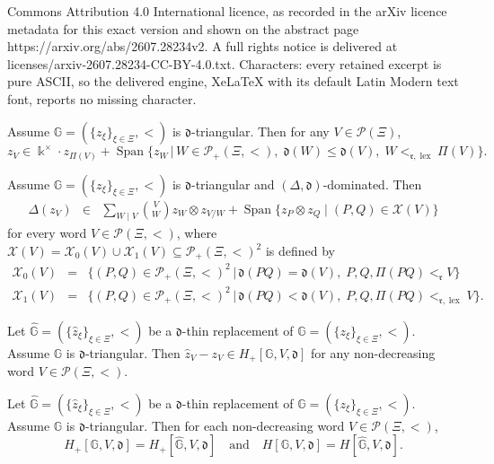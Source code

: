 \documentclass[10pt,a4paper]{amsart}
\newcommand{\GG}{\mathbb{G}}
\newcommand{\PP}{\mathcal{P}}
\DeclareMathOperator{\Span}{Span}
\newcommand{\dd}{\mathfrak{d}}
\DeclareMathOperator{\lex}{lex}
\newcommand{\rr}{\mathfrak{r}}
\begin{document}
Commons Attribution 4.0 International licence, as recorded in the arXiv licence metadata for this exact version and shown on the abstract page https://arxiv.org/abs/2607.28234v2. A full rights notice is delivered at licenses/arxiv-2607.28234-CC-BY-4.0.txt. Characters: every retained excerpt is pure ASCII, so the delivered engine, XeLaTeX with its default Latin Modern text font, reports no missing character.
	\begin{lemma}\label{rearrangement}
		Assume $\GG=(\{z_{\xi}\}_{\xi\in \Xi}, <)$ is $\dd$-triangular. Then for any $V\in \PP(\Xi)$,
		\[
		z_V \in \Bbbk^{\times} \cdot z_{\Pi(V)} +  \Span\big\{z_{W} \,\big|\, W \in \PP_{+}(\Xi, <),\; \dd(W) \leq \dd(V),\; W<_{\rr,\lex} \Pi(V) \big\}.
		\]
	\end{lemma}

	\begin{prop}\label{comultiplication}
		Assume $\GG=(\{z_\xi\}_{\xi \in\Xi},<)$ is $\dd$-triangular and $(\Delta,\dd)$-dominated. Then
		\begin{eqnarray*}
			\Delta(z_{V}) & \in &  \sum_{W\mid V}\binom{V}{W}z_{W} \otimes z_{V/W} + \Span\{z_{P}\otimes z_{Q} \mid (P,Q) \in \mathcal{X}(V)\}
		\end{eqnarray*}
		for every word $V\in \PP(\Xi, <)$, where $\mathcal{X}(V) = \mathcal{X}_{0}(V)\cup \mathcal{X}_{1}(V) \subseteq  \PP_{+}(\Xi,<)^{2}$ is defined by
		\begin{eqnarray*}
			\mathcal{X}_{0}(V) &=& \big\{ (P,Q) \in \PP_{+}(\Xi,<)^{2} \,\big|\,  \dd(PQ) = \dd(V),\; P, Q, \Pi(PQ)<_{\rr} V \big\}\\
			\mathcal{X}_{1}(V) &=& \big\{ (P,Q) \in \PP_{+}(\Xi,<)^{2} \,\big|\, \dd(PQ) < \dd(V),\; P, Q, \Pi(PQ) <_{\rr,\lex}V \big\}.
		\end{eqnarray*}
	\end{prop}

	\begin{lemma}\label{replacement-control}
		Let $\hat{\GG}=(\{\hat{z}_{\xi}\}_{\xi\in \Xi}, <)$ be a $\dd$-thin replacement of $\GG=(\{z_{\xi}\}_{\xi\in \Xi}, <)$. Assume $\GG$ is $\dd$-triangular. Then $\hat{z}_V -z_{V} \in H_{+}[\GG,V,\dd]$ for any non-decreasing word $V\in \mathcal{P}(\Xi,<)$.
	\end{lemma}

	\begin{lemma}\label{equality of H}
		Let $\hat{\GG}=(\{\hat{z}_{\xi}\}_{\xi\in \Xi}, <)$ be a $\dd$-thin replacement of $\GG=(\{z_{\xi}\}_{\xi\in \Xi}, <)$. Assume $\GG$ is $\dd$-triangular. Then for each non-decreasing word $V\in \mathcal{P}(\Xi, <)$,
		\[
		H_{+}[\GG,V,\dd]=H_{+}[\hat{\GG},V,\dd]
		\quad \text{and} \quad
		H[\GG,V,\dd]=H[\hat{\GG},V,\dd].
		\]
	\end{lemma}
\end{document}
